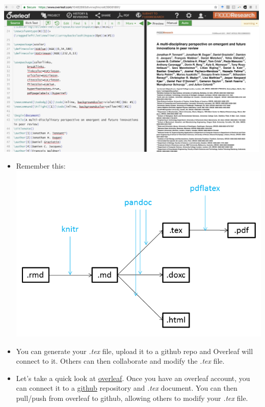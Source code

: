 \documentclass[]{article}
\begin{document}
\includegraphics[width=5.20833in,height=\textheight]{../figures/overleaf.png}

\begin{itemize}
\item
  Remember this:\\
  \includegraphics[width=5.20833in,height=\textheight]{../figures/pandoc1.png}
\item
  You can generate your \emph{.tex} file, upload it to a github repo and
  Overleaf will connect to it. Others can then collaborate and modify
  the \emph{.tex} file.
\item
  Let's take a quick look at \href{https://www.overleaf.com/}{overleaf}.
  Once you have an overleaf account, you can connect it to a
  \href{https://www.github.com/}{github} repository and \emph{.tex}
  document. You can then pull/push from overleaf to github, allowing
  others to modify your \emph{.tex} file.
\end{itemize}
\end{document}
